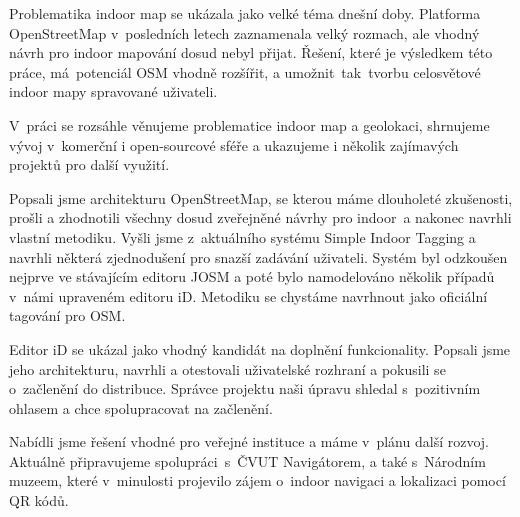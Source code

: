 \begin{conclusion}

Problematika indoor map se ukázala jako velké téma dnešní doby. Platforma OpenStreetMap v~posledních letech zaznamenala velký rozmach, ale vhodný návrh pro indoor mapování dosud nebyl přijat. Řešení, které je výsledkem této práce, má~potenciál OSM vhodně rozšířit, a umožnit~tak~tvorbu celosvětové indoor mapy spravované uživateli.

V~práci se rozsáhle věnujeme problematice indoor map a geolokaci, shrnujeme vývoj v~komerční i open-sourcové sféře a ukazujeme i několik zajímavých projektů pro další využití.

Popsali jsme architekturu OpenStreetMap, se kterou máme dlouholeté zkušenosti, prošli a zhodnotili všechny dosud zveřejněné návrhy pro indoor~a nakonec navrhli vlastní metodiku. Vyšli jsme z~aktuálního systému Simple Indoor Tagging a navrhli některá zjednodušení pro snazší zadávání uživateli. Systém byl odzkoušen nejprve ve stávajícím editoru JOSM a poté bylo namodelováno několik případů v~námi upraveném editoru iD. Metodiku se chystáme navrhnout jako oficiální tagování pro OSM.

Editor iD se ukázal jako vhodný kandidát na doplnění funkcionality. Popsali jsme jeho architekturu, navrhli a otestovali uživatelské rozhraní a pokusili se o~začlenění do distribuce. Správce projektu naši úpravu shledal s~pozitivním ohlasem a chce spolupracovat na začlenění.

Nabídli jsme řešení vhodné pro veřejné instituce a máme v~plánu další rozvoj. Aktuálně připravujeme spolupráci~s~ČVUT Navigátorem, a také s~Národním muzeem, které v~minulosti projevilo zájem o~indoor navigaci a lokalizaci pomocí QR kódů.

\end{conclusion}